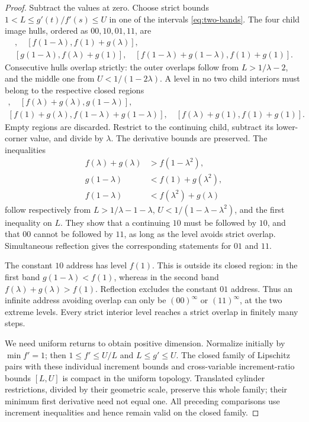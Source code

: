 \begin{proof}
Subtract the values at zero. Choose strict bounds
\(1<L\leq g'(t)/f'(s)\leq U\) in one of the intervals
\eqref{eq:two-bands}. The four child image hulls, ordered as
\(00,10,01,11\), are
\begin{gather*}
[0,f(\lambda)+g(\lambda)],\quad
[f(1-\lambda),f(1)+g(\lambda)],\\
[g(1-\lambda),f(\lambda)+g(1)],\quad
[f(1-\lambda)+g(1-\lambda),f(1)+g(1)].
\end{gather*}
Consecutive hulls overlap strictly: the outer overlaps follow from
\(L>1/\lambda-2\), and the middle one from
\(U<1/(1-2\lambda)\). A level in no two child interiors must
belong to the respective closed regions
\begin{gather*}
[0,f(1-\lambda)],\quad
[f(\lambda)+g(\lambda),g(1-\lambda)],\\
[f(1)+g(\lambda),f(1-\lambda)+g(1-\lambda)],\quad
[f(\lambda)+g(1),f(1)+g(1)].
\end{gather*}
Empty regions are discarded. Restrict to the continuing child,
subtract its lower-corner value, and divide by \(\lambda\).
The derivative bounds are preserved. The inequalities
\begin{align*}
f(\lambda)+g(\lambda)&>f(1-\lambda^2),\\
g(1-\lambda)&<f(1)+g(\lambda^2),\\
f(1-\lambda)&<f(\lambda^2)+g(\lambda)
\end{align*}
follow respectively from
\(L>1/\lambda-1-\lambda\),
\(U<1/(1-\lambda-\lambda^2)\), and the first inequality on \(L\).
They show that a continuing \(10\) must be followed by \(10\),
and that \(00\) cannot be followed by \(11\), as long as the level
avoids strict overlap. Simultaneous reflection gives the corresponding
statements for \(01\) and \(11\).

The constant \(10\) address has level \(f(1)\). This is outside
its closed region: in the first band \(g(1-\lambda)<f(1)\),
whereas in the second band \(f(\lambda)+g(\lambda)>f(1)\).
Reflection excludes the constant \(01\) address. Thus an infinite
address avoiding overlap can only be \((00)^\infty\) or
\((11)^\infty\), at the two extreme levels. Every strict interior
level reaches a strict overlap in finitely many steps.

We need uniform returns to obtain positive dimension. Normalize
initially by \(\min f'=1\); then
\(1\leq f'\leq U/L\) and \(L\leq g'\leq U\).
The closed family of Lipschitz pairs with these individual increment
bounds and cross-variable increment-ratio bounds \([L,U]\) is
compact in the uniform topology. Translated cylinder restrictions,
divided by their geometric scale, preserve this whole family;
their minimum first derivative need not equal one.
All preceding comparisons use increment inequalities and hence
remain valid on the closed family.


\end{proof}
